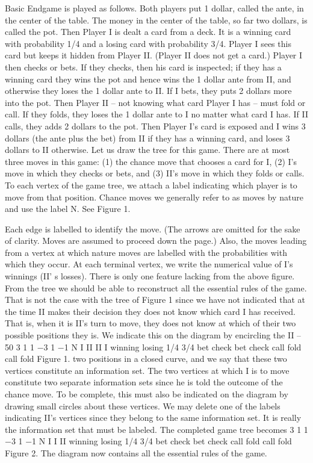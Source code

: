 \documentclass[]{report}
\begin{document}
Basic Endgame is played as follows. Both players put 1 dollar, called the ante, in the
center of the table. The money in the center of the table, so far two dollars, is called the
pot. Then Player I is dealt a card from a deck. It is a winning card with probability 1/4
and a losing card with probability 3/4. Player I sees this card but keeps it hidden from
Player II. (Player II does not get a card.) Player I then checks or bets. If they checks, then
his card is inspected; if they has a winning card they wins the pot and hence wins the 1 dollar
ante from II, and otherwise they loses the 1 dollar ante to II. If I bets, they puts 2 dollars more
into the pot. Then Player II – not knowing what card Player I has – must fold or call. If
they folds, they loses the 1 dollar ante to I no matter what card I has. If II calls, they adds 2
dollars to the pot. Then Player I’s card is exposed and I wins 3 dollars (the ante plus the
bet) from II if they has a winning card, and loses 3 dollars to II otherwise.
Let us draw the tree for this game. There are at most three moves in this game: (1)
the chance move that chooses a card for I, (2) I’s move in which they checks or bets, and (3)
II’s move in which they folds or calls. To each vertex of the game tree, we attach a label
indicating which player is to move from that position. Chance moves we generally refer to
as moves by nature and use the label N. See Figure 1.

Each edge is labelled to identify the move. (The arrows are omitted for the sake of
clarity. Moves are assumed to proceed down the page.) Also, the moves leading from a
vertex at which nature moves are labelled with the probabilities with which they occur.
At each terminal vertex, we write the numerical value of I’s winnings (II’ s losses).
There is only one feature lacking from the above figure. From the tree we should be
able to reconstruct all the essential rules of the game. That is not the case with the tree of
Figure 1 since we have not indicated that at the time II makes their decision they does not
know which card I has received. That is, when it is II’s turn to move, they does not know at
which of their two possible positions they is. We indicate this on the diagram by encircling the
II – 50
3 1
1
−3 1
−1
N
I
II II
I
winning losing
1/4 3/4
bet check bet check
call fold call fold
Figure 1.
two positions in a closed curve, and we say that these two vertices constitute an information
set. The two vertices at which I is to move constitute two separate information sets since
he is told the outcome of the chance move. To be complete, this must also be indicated
on the diagram by drawing small circles about these vertices. We may delete one of the
labels indicating II’s vertices since they belong to the same information set. It is really
the information set that must be labeled. The completed game tree becomes
3 1
1
−3 1
−1
N
I I
II
winning losing
1/4 3/4
bet check bet check
call fold call fold
Figure 2.
The diagram now contains all the essential rules of the game.
\end{document}
